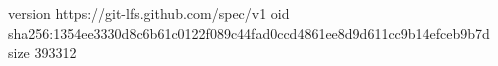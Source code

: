 version https://git-lfs.github.com/spec/v1
oid sha256:1354ee3330d8c6b61c0122f089c44fad0ccd4861ee8d9d611cc9b14efceb9b7d
size 393312

